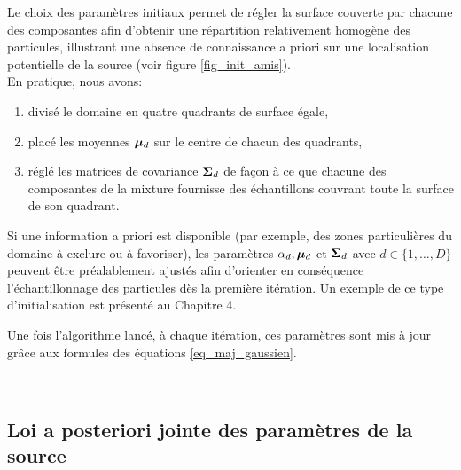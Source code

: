 {  Le choix des paramètres initiaux permet de régler la surface couverte par chacune des composantes afin d'obtenir une répartition relativement homogène des particules, illustrant une absence de connaissance a priori sur une localisation potentielle de la source (voir figure \ref{fig_init_amis}). \\
  
  En pratique, nous avons:
  
  \begin{enumerate}
  	\item divisé le domaine en quatre quadrants de surface égale, 
  	\item  placé les moyennes ${\bm{\mu}}_d$ sur le centre de chacun des quadrants,
  	\item réglé les matrices de covariance ${\bm{\Sigma}}_d$ de façon à ce que chacune des composantes de la mixture fournisse des échantillons couvrant toute la surface de son quadrant.\\
  \end{enumerate}
  
 {Si une information a priori est disponible (par exemple, des zones particulières du domaine à exclure ou à favoriser), les paramètres $\alpha_d, {\bm{\mu}}_d$ et ${\bm{\Sigma}}_d$ avec $d \in \{1,\dots,D\}$ peuvent être préalablement ajustés afin d'orienter en conséquence l'échantillonnage des particules dès la première itération. Un exemple de ce type d'initialisation est présenté au Chapitre 4.
 	
 	Une fois l'algorithme lancé, à chaque itération, ces paramètres  sont mis à jour grâce aux formules des équations \eqref{eq_maj_gaussien}.}\\

\subsection{Loi a posteriori jointe des paramètres de la source}



}
